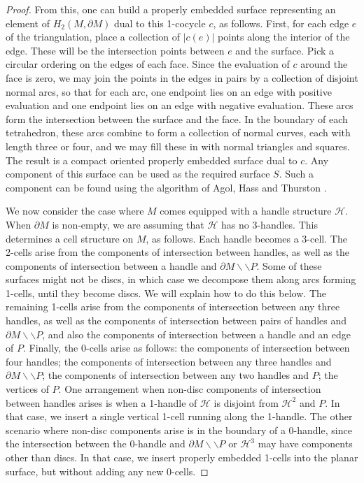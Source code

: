\documentclass[oneside]{amsart}
\numberwithin{equation}{section}
\theoremstyle{plain}
\theoremstyle{definition}
\newcommand{\cut}{\backslash\backslash}
\newcommand{\calH}{\mathcal{H}}
\begin{document}
\begin{proof}
From this, one can build a properly embedded surface representing an element of $H_2(M, \partial M)$ dual to this 1-cocycle $c$, as follows. First, for each edge $e$ of the triangulation, place a collection of $|c(e)|$ points along the interior of the edge. These will be the intersection points between $e$ and the surface. Pick a circular ordering on the edges of each face. Since the evaluation of $c$ around the face is zero, we may join the points in the edges in pairs by a collection of disjoint normal arcs, so that for each arc, one endpoint lies on an edge with positive evaluation and one endpoint lies on an edge with negative evaluation. These arcs form the intersection between the surface and the face. In the boundary of each tetrahedron, these arcs combine to form a collection of normal curves, each with length three or four, and we may fill these in with normal triangles and squares. The result is a compact oriented properly embedded surface dual to $c$. Any component of this surface can be used as the required surface $S$. Such a component can be found using the algorithm of Agol, Hass and Thurston \cite[Corollary 17]{AgolHassThurston}.

We now consider the case where $M$ comes equipped with a handle structure $\calH$. When $\partial M$ is non-empty, we are assuming that $\calH$ has no 3-handles. This determines a cell structure on $M$, as follows. Each handle becomes a 3-cell. The 2-cells arise from the components of intersection between handles, as well as the components of intersection between a handle and $\partial M \cut P$. Some of these surfaces might not be discs, in which case we decompose them along arcs forming 1-cells, until they become discs. We will explain how to do this below. The remaining 1-cells arise from the components of intersection between any three handles, as well as the components of intersection between pairs of handles and $\partial M \cut P$, and also the components of intersection between a handle and an edge of $P$. Finally, the 0-cells arise as follows: the components of intersection between four handles; the components of intersection between any three handles and $\partial M \cut P$; the components of intersection between any two handles and $P$; the vertices of $P$. One arrangement when non-disc components of intersection between handles arises is when a 1-handle of $\calH$ is disjoint from $\calH^2$ and $P$. In that case, we insert a single vertical 1-cell running along the 1-handle. The other scenario where non-disc components arise is in the boundary of a 0-handle, since the intersection between the 0-handle and $\partial M \cut P$ or $\calH^3$ may have components other than discs. In that case, we insert properly embedded 1-cells into the planar surface, but without adding any new 0-cells. 


\end{proof}
\end{document}
